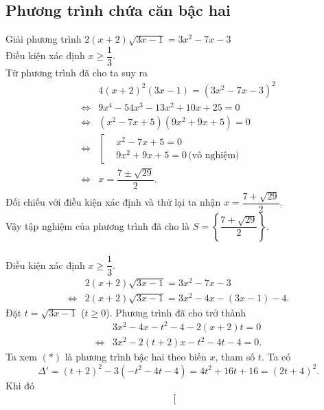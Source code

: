 \subsection{Phương trình chứa căn bậc hai}

\begin{bt}%
	Giải phương trình $2(x + 2)\sqrt{3x - 1} = 3x^2 - 7x - 3$
	\loigiai
	{
		\\
		Điều kiện xác định $x \geq \dfrac{1}{3}$.\\
		Từ phương trình đã cho ta suy ra
		\begin{align*}
		& 4(x + 2)^2 (3x - 1) = (3x^2 - 7x - 3)^2 \\
		\Leftrightarrow & 9x^4 - 54x^3 - 13x^2 + 10x + 25 = 0 \\
		\Leftrightarrow & (x^2 - 7x + 5)(9x^2 + 9x + 5) = 0 \\
		\Leftrightarrow & \left[\begin{aligned} & x^2 - 7x + 5 = 0 \\ & 9x^2 + 9x + 5 = 0 \, \text{(vô nghiệm)}\end{aligned}\right.\\
		\Leftrightarrow & x = \dfrac{7 \pm \sqrt{29}}{2}.
		\end{align*}
		Đối chiếu với điều kiện xác định và thử lại ta nhận $x = \dfrac{7 + \sqrt{29}}{2}$.\\
		Vậy tập nghiệm của phương trình đã cho là $S = \left\{ \dfrac{7 + \sqrt{29}}{2} \right\}$.\\
		\\
		Điều kiện xác định $x \geq \dfrac{1}{3}$.
		\begin{align*}
		& 2(x + 2)\sqrt{3x - 1} = 3x^2 - 7x - 3 \\
		\Leftrightarrow & 2(x + 2)\sqrt{3x - 1} = 3x^2 - 4x - (3x - 1) - 4.
		\end{align*}
		Đặt $t = \sqrt{3x - 1}$ ($t \geq 0$). Phương trình đã cho trở thành
		\begin{align*}
		& 3x^2 - 4x - t^2 - 4 - 2(x + 2)t = 0 \\
		\Leftrightarrow & 3x^2 - 2(t + 2)x - t^2 - 4t - 4 = 0. \tag{*}
		\end{align*}
		Ta xem $(*)$ là phương trình bậc hai theo biến $x$, tham số $t$. Ta có
		$$\Delta' = (t + 2)^2 - 3 (-t^2 - 4t - 4) = 4t^2 + 16t + 16 = (2t + 4)^2.$$
		Khi đó 
		\begin{align*}
		\left[\begin{aligned}

\end{aligned}
\end{align*}}
\end{bt}
